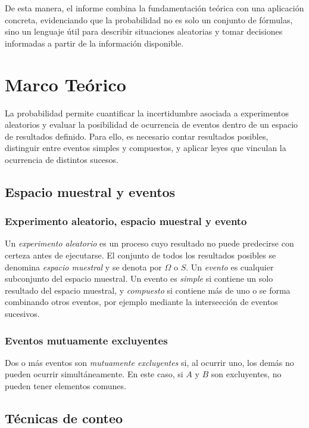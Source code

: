 \documentclass[10pt,letterpaper]{article}
\begin{document}
De esta manera, el informe combina la fundamentación teórica con una aplicación concreta, evidenciando que la probabilidad no es solo un conjunto de fórmulas, sino un lenguaje útil para describir situaciones aleatorias y tomar decisiones informadas a partir de la información disponible.

\clearpage
\section{Marco Teórico}\label{sec:marco}

La probabilidad permite cuantificar la incertidumbre asociada a experimentos aleatorios y evaluar la posibilidad de ocurrencia de eventos dentro de un espacio de resultados definido. Para ello, es necesario contar resultados posibles, distinguir entre eventos simples y compuestos, y aplicar leyes que vinculan la ocurrencia de distintos sucesos.

\subsection{Espacio muestral y eventos}

\subsubsection{Experimento aleatorio, espacio muestral y evento}

Un \textit{experimento aleatorio} es un proceso cuyo resultado no puede predecirse con certeza antes de ejecutarse. El conjunto de todos los resultados posibles se denomina \textit{espacio muestral} y se denota por $\Omega$ o $S$. Un \textit{evento} es cualquier subconjunto del espacio muestral. Un evento es \textit{simple} si contiene un solo resultado del espacio muestral, y \textit{compuesto} si contiene más de uno o se forma combinando otros eventos, por ejemplo mediante la intersección de eventos sucesivos.

\subsubsection{Eventos mutuamente excluyentes}

Dos o más eventos son \textit{mutuamente excluyentes} si, al ocurrir uno, los demás no pueden ocurrir simultáneamente. En este caso, si $A$ y $B$ son excluyentes, no pueden tener elementos comunes.

\subsection{Técnicas de conteo}
\end{document}
